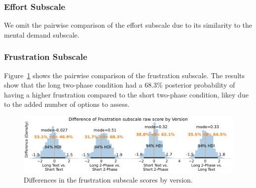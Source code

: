 \subsubsection{Effort Subscale}
We omit the pairwise comparison of the effort subscale due to its similarity to the mental demand subscale. 


\subsubsection{Frustration Subscale}
Figure~\ref{fig:bayesian_frustration_subscale} shows the pairwise comparison of the frustration subscale. The results show that the long two-phase condition had a 68.3\% posterior probability of having a higher frustration compared to the short two-phase condition, likey due to the added number of options to assess. 

\begin{figure}[h!]
    \centering
    \includegraphics[width=\textwidth]{content/image/cog/Frustration_cog_diff_single_row.pdf}
    \caption{Differences in the frustration subscale scores by version.}
    \label{fig:bayesian_frustration_subscale}
\end{figure}
